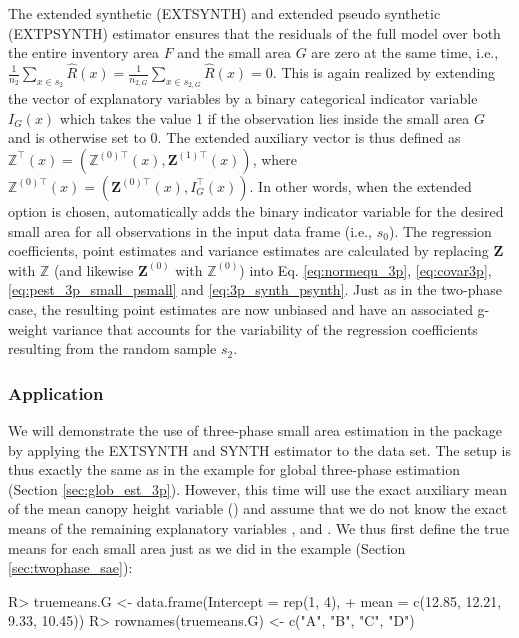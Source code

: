 The extended synthetic (EXTSYNTH) and extended pseudo synthetic (EXTPSYNTH) estimator ensures that the residuals of the full model over both the entire inventory area $F$ and the small area $G$ are zero at the same time, i.e., $\frac{1}{n_{2}}\sum_{x \in s_{2}}\hat{R}(x) = \frac{1}{n_{2,G}}\sum_{x \in s_{2,G}}\hat{R}(x)=0$. This is again realized by extending the vector of explanatory variables by a binary categorical indicator variable $I_G(x)$ which takes the value 1 if the observation lies inside the small area $G$ and is otherwise set to 0. The extended auxiliary vector is thus defined as $\pmb{\mathbb{Z}}^{\top}(x)=(\pmb{\mathbb{Z}}^{(0)\top}(x),\pmb{Z}^{(1)\top}(x))$, where $\pmb{\mathbb{Z}}^{(0)\top}(x)=(\pmb{Z}^{(0)\top}(x), I_G^{\top}(x))$. In other words, when the extended option is chosen,  automatically adds the binary indicator variable for the desired small area for all observations in the input data frame (i.e., $s_0$). The regression coefficients, point estimates and variance estimates are calculated by replacing $\pmb{Z}$ with $\pmb{\mathbb{Z}}$ (and likewise $\pmb{Z}^{(0)}$ with $\pmb{\mathbb{Z}}^{(0)}$) into Eq. \ref{eq:normequ_3p}, \ref{eq:covar3p}, \ref{eq:pest_3p_small_psmall} and \ref{eq:3p_synth_psynth}. Just as in the two-phase case, the resulting point estimates are now unbiased and have an associated g-weight variance that accounts for the variability of the regression coefficients resulting from the random sample $s_2$.


\subsubsection{Application}


We will demonstrate the use of three-phase small area estimation in the package  by applying the EXTSYNTH and SYNTH estimator to the  data set. The setup is thus exactly the same as in the example for global three-phase estimation (Section \ref{sec:glob_est_3p}). However, this time will use the exact auxiliary mean of the mean canopy height variable () and assume that we do not know the exact means of the remaining explanatory variables ,  and . We thus first define the true means for each small area just as we did in the  example (Section \ref{sec:twophase_sae}):

\begin{small}
\begin{Schunk}
\begin{Sinput}
R> truemeans.G <- data.frame(Intercept = rep(1, 4),
+    mean = c(12.85, 12.21, 9.33, 10.45))
R> rownames(truemeans.G) <- c("A", "B", "C", "D")
\end{Sinput}
\end{Schunk}
\end{small}

